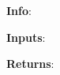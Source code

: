 \textbf{Info}:

\noindent \textbf{Inputs}:
    \begin{itemize}
    \end{itemize}

\noindent \textbf{Returns}:
